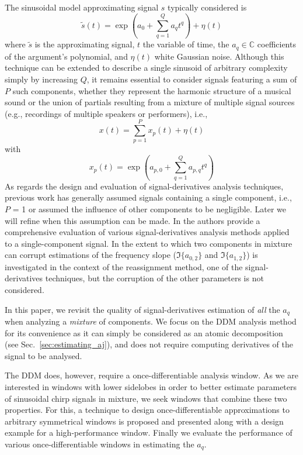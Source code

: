 \documentclass[twoside,a4paper]{article}
\begin{document}
The sinusoidal model approximating signal $s$ typically considered is
%
\begin{equation}
    \label{eq:polyphaseexp}
    \tilde{s}(t) = \exp(a_0 + \sum_{q=1}^{Q} a_{q} t^q) + \eta(t)
\end{equation}
where $\tilde{s}$ is the approximating signal, $t$ the variable of time, the
$a_{q} \in \mathbb{C}$ coefficients of the argument's polynomial, and $\eta(t)$
white Gaussian noise.
%
Although this technique can be extended to describe a single sinusoid of
arbitrary complexity simply by increasing $Q$, it remains essential to consider
signals featuring a sum of $P$ such components, whether they represent the harmonic structure of a musical sound or the union of partials resulting from a mixture of multiple signal sources (e.g., recordings of multiple speakers or performers),  i.e., 
%
\begin{equation}
    \label{eq:polyphaseexpmix}
    x(t) = \sum_{p=1}^{P} x_{p}(t) + \eta(t)
\end{equation}
%
with
%
\begin{equation}
    x_{p}(t) = \exp(a_{p,0} + \sum_{q=1}^{Q} a_{p,q} t^q)
\end{equation}
%
As regards the design and evaluation of signal-derivatives analysis techniques,
previous work has generally assumed signals containing a single component, i.e.,
$P$ = 1 or assumed the influence of other components to be negligible. Later we
will refine when this assumption can be made. In \cite{hamilton2012comparisons}
the authors provide a comprehensive evaluation of various signal-derivatives
analysis methods applied to a single-component signal. In
\cite{robel2002estimating} the extent to which two components in mixture can
corrupt estimations of the frequency slope ($\Im\{a_{0,2}\}$ and
$\Im\{a_{1,2}\}$) is investigated in the context of the reassignment method, one
of the signal-derivatives techniques, but the corruption of the other
parameters is not considered.

In this paper, we revisit the quality of signal-derivatives estimation of
\textit{all} the $a_{q}$ when analyzing a \textit{mixture} of components. We focus on
the DDM \cite{betser2009sinusoidal} analysis method for its convenience as it
can simply be considered as an atomic decomposition (see
Sec.~\ref{sec:estimating_aj}), and does not require computing derivatives
of the signal to be analysed.

The DDM does, however, require a once-differentiable analysis window. As we are
interested in windows with lower sidelobes in order to better estimate
parameters of sinusoidal chirp signals in mixture, we seek windows that
combine these two properties. For this, a technique to design
once-differentiable approximations to arbitrary symmetrical windows is proposed
and presented along with a design example for a high-performance window. Finally
we evaluate the performance of various once-differentiable windows in estimating
the $a_{q}$.
\end{document}

